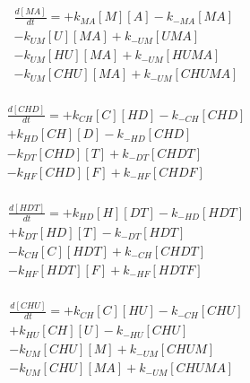 \begin{equation}
\begin{split}
\frac{d[MA]}{dt} =    + k_{MA}[M][A]    - k_{-MA}[MA]     \\%
                      - k_{UM}[U][MA]   + k_{-UM}[UMA]    \\%
                      - k_{UM}[HU][MA]  + k_{-UM}[HUMA]   \\%
                      - k_{UM}[CHU][MA] + k_{-UM}[CHUMA]  \\%
\end{split}
\end{equation}

\begin{equation}
\begin{split}
\frac{d[CHD]}{dt} =   + k_{CH}[C][HD]  - k_{-CH}[CHD]     \\%
                      + k_{HD}[CH][D]  - k_{-HD}[CHD]     \\%
                      - k_{DT}[CHD][T] + k_{-DT}[CHDT]    \\%
                      - k_{HF}[CHD][F] + k_{-HF}[CHDF]    \\%
\end{split}
\end{equation}

\begin{equation}
\begin{split}
\frac{d[HDT]}{dt} =   + k_{HD}[H][DT]  - k_{-HD}[HDT]     \\%
                      + k_{DT}[HD][T]  - k_{-DT}[HDT]     \\%
                      - k_{CH}[C][HDT] + k_{-CH}[CHDT]    \\%
                      - k_{HF}[HDT][F] + k_{-HF}[HDTF]    \\%
\end{split}
\end{equation}

\begin{equation}
\begin{split}
\frac{d[CHU]}{dt} =   + k_{CH}[C][HU]   - k_{-CH}[CHU]    \\%
                      + k_{HU}[CH][U]   - k_{-HU}[CHU]    \\%
                      - k_{UM}[CHU][M]  + k_{-UM}[CHUM]   \\%
                      - k_{UM}[CHU][MA] + k_{-UM}[CHUMA]  \\%
\end{split}
\end{equation}

